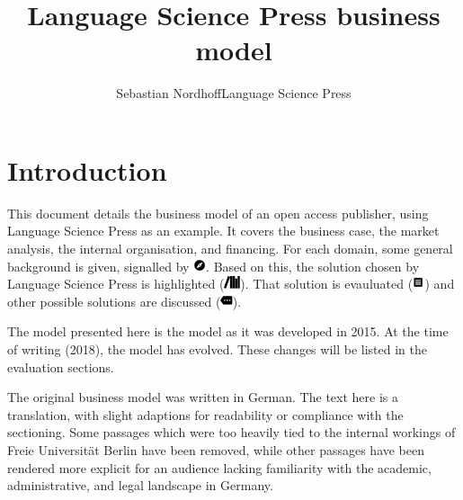 \documentclass[nonflat,smallfont
]{langsci/langscibook}
\title{Language Science Press business model}
\author{Sebastian Nordhoff\newlineCover Language Science Press}
\begin{document}
\maketitle
\tableofcontents
\mainmatter
\chapter{Introduction}
This document details the business model of an open access publisher, using Language Science Press as an example. It covers the
business case,
the market analysis, 
the internal organisation, 
and financing. 
For each domain, some general background is given, signalled by {\color{yellow}\includegraphics[height=1em]{langsci/graphics/explore.pdf}}.
Based on this, the solution chosen by Language Science Press is highlighted ({\color{lsLightBlue}\includegraphics[height=1em]{langsci/graphics/tbls-langsci.pdf}}).
That solution is evauluated ({\color{lsLightOrange}\includegraphics[height=1em]{langsci/graphics/tbls-receipt.pdf}})
and other possible solutions are discussed ({\color{lsDarkGreenOne}\includegraphics[height=1em]{langsci/graphics/tbls-more.pdf}}). 

The model presented here is the model as it was developed in 2015. At the time of writing (2018), the model has evolved. These changes will be listed in the evaluation sections. 

The original business model was written in German. The text here is a translation, with slight adaptions for readability or compliance with the sectioning. Some passages which were too heavily tied to the internal workings of Freie Universität Berlin have been removed, while other passages have been rendered more explicit for an audience lacking familiarity with the academic, administrative, and legal landscape in Germany. 
\end{document}
